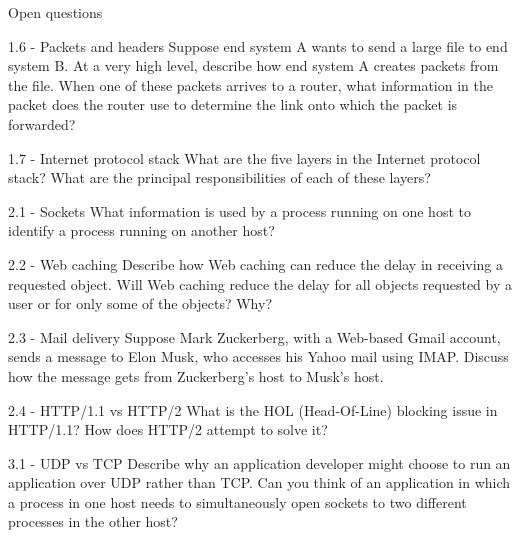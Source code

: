 \documentclass[a4paper]{article}
\begin{document}
\begin{quiz}{Open questions}
\begin{essay}[points=1]{1.6 - Packets and headers}
Suppose end system A wants to send a large file to end system B. At a very high level, describe how end system A creates packets from the file. When one of these packets arrives to a router, what information in the packet does the router use to determine the link onto which the packet is forwarded? 
\end{essay}

\begin{essay}[points=1]{1.7 - Internet protocol stack}
What are the five layers in the Internet protocol stack? What are the principal responsibilities of each of these layers?
\end{essay}


\begin{essay}[points=1]{2.1 - Sockets}
What information is used by a process running on one host to identify a process running on another host? 
\end{essay}

\begin{essay}[points=1]{2.2 - Web caching}
Describe how Web caching can reduce the delay in receiving a requested object. Will Web caching reduce the delay for all objects requested by a user or for only some of the objects? Why? 
\end{essay}

\begin{essay}[points=1]{2.3 - Mail delivery}
Suppose Mark Zuckerberg, with a Web-based Gmail account, sends a message to Elon Musk, who accesses his Yahoo mail using IMAP. Discuss how the message gets from Zuckerberg's host to Musk's host. 
\end{essay}

\begin{essay}[points=1]{2.4 - HTTP/1.1 vs HTTP/2}
What is the HOL (Head-Of-Line) blocking issue in HTTP/1.1? How does HTTP/2 attempt to solve it?
\end{essay}


\begin{essay}[points=1]{3.1 - UDP vs TCP}
Describe why an application developer might choose to run an application over UDP rather than TCP. Can you think of an application in which a process in one host needs to simultaneously open sockets to two different processes in the other host?
\end{essay}


\end{quiz}
\end{document}
